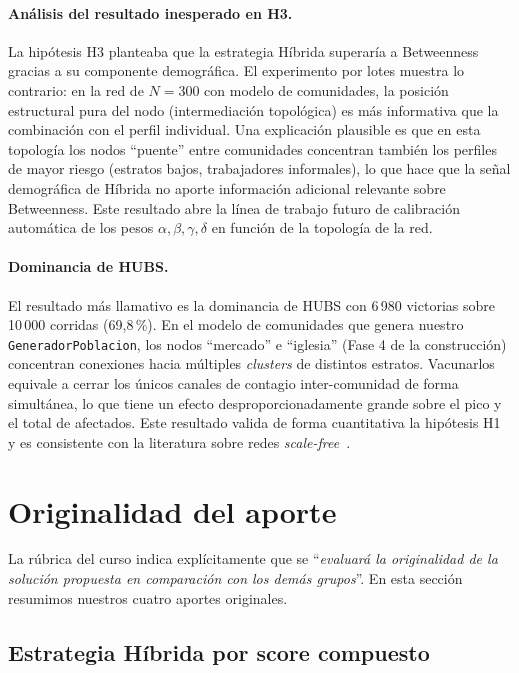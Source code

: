 \documentclass[spanish,notitlepage,letterpaper, 12pt]{article}
\begin{document}
\paragraph{Análisis del resultado inesperado en H3.}
La hipótesis H3 planteaba que la estrategia Híbrida superaría a Betweenness gracias
a su componente demográfica. El experimento por lotes muestra lo contrario: en la
red de $N = 300$ con modelo de comunidades, la posición estructural pura del nodo
(intermediación topológica) es más informativa que la combinación con el perfil
individual. Una explicación plausible es que en esta topología los nodos ``puente''
entre comunidades concentran también los perfiles de mayor riesgo (estratos bajos,
trabajadores informales), lo que hace que la señal demográfica de Híbrida no aporte
información adicional relevante sobre Betweenness. Este resultado abre la línea de
trabajo futuro de calibración automática de los pesos $\alpha, \beta, \gamma,
\delta$ en función de la topología de la red.

\paragraph{Dominancia de HUBS.}
El resultado más llamativo es la dominancia de HUBS con 6\,980 victorias sobre
10\,000 corridas (69,8\,\%). En el modelo de comunidades que genera nuestro
\texttt{GeneradorPoblacion}, los nodos ``mercado'' e ``iglesia'' (Fase 4 de la
construcción) concentran conexiones hacia múltiples \textit{clusters} de distintos
estratos. Vacunarlos equivale a cerrar los únicos canales de contagio inter-comunidad
de forma simultánea, lo que tiene un efecto desproporcionadamente grande sobre el
pico y el total de afectados. Este resultado valida de forma cuantitativa la hipótesis
H1 y es consistente con la literatura sobre redes \textit{scale-free}~\cite{barabasi}.
\newpage
\section{Originalidad del aporte}
\label{sec:originalidad}

La r\'ubrica del curso indica expl\'icitamente que se ``\textit{evaluar\'a la originalidad de la soluci\'on propuesta en comparaci\'on con los dem\'as grupos}''. En esta secci\'on resumimos nuestros cuatro aportes originales.

\subsection{Estrategia H\'ibrida por score compuesto}
\end{document}
